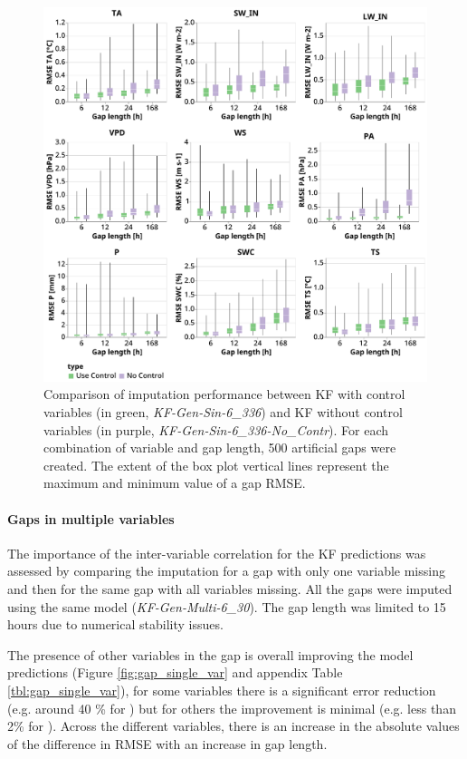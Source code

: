 \documentclass{article}
\newcommand{\imgwidth}{6in}
\begin{document}
\begin{figure}
\centerline{\includegraphics[width=\imgwidth]{use_control}}
\caption{Comparison of imputation performance between KF with control variables (in green, \textit{KF-Gen-Sin-6\_336}) and KF without control variables (in purple, \textit{KF-Gen-Sin-6\_336-No\_Contr}). For each combination of variable and gap length, 500 artificial gaps were created. The extent of the box plot vertical lines represent the maximum and minimum value of a gap RMSE.}
\label{fig:control}
\end{figure}

\paragraph{Gaps in multiple variables} The importance of the inter-variable correlation for the KF predictions was assessed by comparing the imputation for a gap with only one variable missing and then for the same gap with all variables missing. All the gaps were imputed using the same model (\textit{KF-Gen-Multi-6\_30}). The gap length was limited to 15 hours due to numerical stability issues.

The presence of other variables in the gap is overall improving the model predictions (Figure \ref{fig:gap_single_var} and appendix Table \ref{tbl:gap_single_var}), for some variables there is a significant error reduction (e.g. around 40 \% for ) but for others the improvement is minimal (e.g. less than 2\% for ).
Across the different variables, there is an increase in the absolute values of the difference in RMSE with an increase in gap length.
\end{document}
